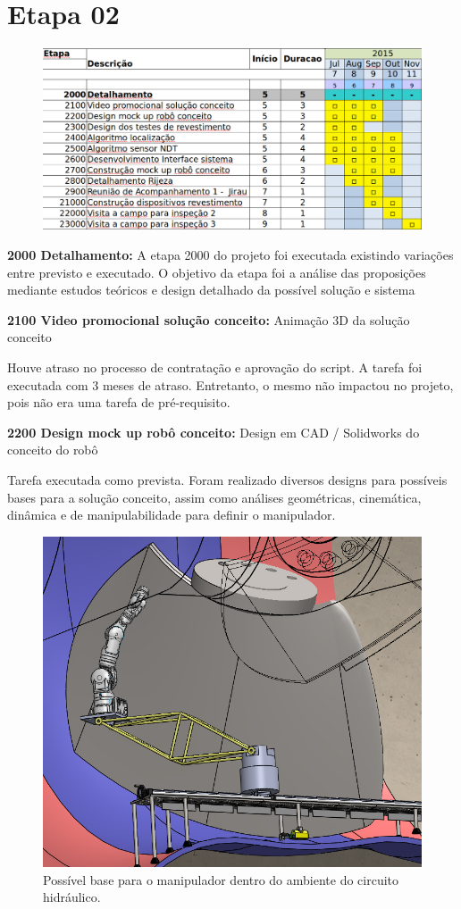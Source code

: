 \section{Etapa 02}

\begin{figure}
\centering
\includegraphics[width=0.9\columnwidth]{figs/etapa2}
\end{figure} 

\textbf{2000 Detalhamento:} A etapa 2000 do projeto foi executada existindo
variações entre previsto e executado. O objetivo da etapa foi a análise das
proposições mediante estudos teóricos e design detalhado da possível solução e sistema

\textbf{2100 Video promocional solução conceito:} Animação 3D da solução
conceito

Houve atraso no processo de contratação e aprovação do script. A tarefa foi
executada com 3 meses de atraso. Entretanto, o mesmo não impactou no projeto,
pois não era uma tarefa de pré-requisito.

\textbf{2200 Design mock up robô conceito:} Design em CAD / Solidworks do
conceito do robô

Tarefa executada como prevista. Foram realizado diversos designs para possíveis
bases para a solução conceito, assim como análises geométricas, cinemática,
dinâmica e de manipulabilidade para definir o manipulador.

\begin{figure}\centering
\includegraphics[width=0.9\columnwidth]{figs/EMMA_Base_Conceito_PRR}
\caption{Possível base para o manipulador dentro do ambiente do circuito
hidráulico.}
\end{figure} 


